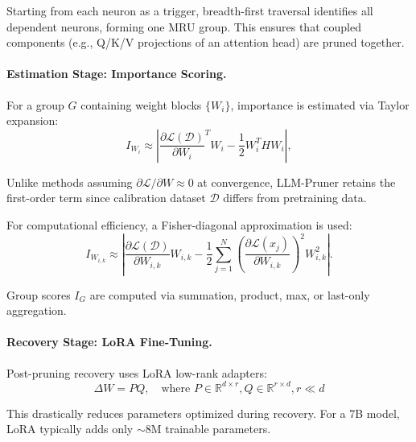 Starting from each neuron as a trigger, breadth-first traversal identifies all dependent neurons, forming one MRU group. This ensures that coupled components (e.g., Q/K/V projections of an attention head) are pruned together.

\paragraph{Estimation Stage: Importance Scoring.}
For a group $G$ containing weight blocks $\{W_i\}$, importance is estimated via Taylor expansion:
\begin{equation}
	I_{W_i}
	\approx
	\left|\frac{\partial \mathcal{L}(\mathcal{D})}{\partial W_i}^T W_i
	-\frac{1}{2} W_i^T H W_i\right|,
	\label{eq:taylor-vector}
\end{equation}

Unlike methods assuming $\partial\mathcal{L}/\partial W \approx 0$ at convergence, LLM-Pruner retains the first-order term since calibration dataset $\mathcal{D}$ differs from pretraining data.

For computational efficiency, a Fisher-diagonal approximation is used:
\begin{equation}
	I_{W_{i,k}} \approx
	\left| \frac{\partial\mathcal{L}(\mathcal{D})}{\partial W_{i,k}} W_{i,k}
	- \frac{1}{2}\sum_{j=1}^N \left(\frac{\partial\mathcal{L}(x_j)}{\partial W_{i,k}}\right)^2 W_{i,k}^2\right|.
\end{equation}

Group scores $I_G$ are computed via summation, product, max, or last-only aggregation.

\paragraph{Recovery Stage: LoRA Fine-Tuning.}
Post-pruning recovery uses LoRA \cite{hu2021lora} low-rank adapters:
\begin{equation}
	\Delta W = PQ, \quad \text{where } P \in \mathbb{R}^{d \times r}, Q \in \mathbb{R}^{r \times d}, r \ll d
\end{equation}

This drastically reduces parameters optimized during recovery. For a 7B model, LoRA typically adds only $\sim$8M trainable parameters.

